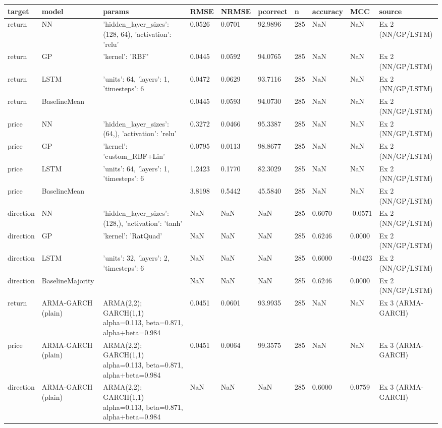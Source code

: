 \begin{table}[H]
\centering
\small
\begin{tabular}{llllllllll}
\toprule
target & model & params & RMSE & NRMSE & pcorrect & n & accuracy & MCC & source \\
\midrule
return & NN & {'hidden_layer_sizes': (128, 64), 'activation': 'relu'} & 0.0526 & 0.0701 & 92.9896 & 285 & NaN & NaN & Ex 2 (NN/GP/LSTM) \\
return & GP & {'kernel': 'RBF'} & 0.0445 & 0.0592 & 94.0765 & 285 & NaN & NaN & Ex 2 (NN/GP/LSTM) \\
return & LSTM & {'units': 64, 'layers': 1, 'timesteps': 6} & 0.0472 & 0.0629 & 93.7116 & 285 & NaN & NaN & Ex 2 (NN/GP/LSTM) \\
return & BaselineMean & {} & 0.0445 & 0.0593 & 94.0730 & 285 & NaN & NaN & Ex 2 (NN/GP/LSTM) \\
price & NN & {'hidden_layer_sizes': (64,), 'activation': 'relu'} & 0.3272 & 0.0466 & 95.3387 & 285 & NaN & NaN & Ex 2 (NN/GP/LSTM) \\
price & GP & {'kernel': 'custom_RBF+Lin'} & 0.0795 & 0.0113 & 98.8677 & 285 & NaN & NaN & Ex 2 (NN/GP/LSTM) \\
price & LSTM & {'units': 64, 'layers': 1, 'timesteps': 6} & 1.2423 & 0.1770 & 82.3029 & 285 & NaN & NaN & Ex 2 (NN/GP/LSTM) \\
price & BaselineMean & {} & 3.8198 & 0.5442 & 45.5840 & 285 & NaN & NaN & Ex 2 (NN/GP/LSTM) \\
direction & NN & {'hidden_layer_sizes': (128,), 'activation': 'tanh'} & NaN & NaN & NaN & 285 & 0.6070 & -0.0571 & Ex 2 (NN/GP/LSTM) \\
direction & GP & {'kernel': 'RatQuad'} & NaN & NaN & NaN & 285 & 0.6246 & 0.0000 & Ex 2 (NN/GP/LSTM) \\
direction & LSTM & {'units': 32, 'layers': 2, 'timesteps': 6} & NaN & NaN & NaN & 285 & 0.6000 & -0.0423 & Ex 2 (NN/GP/LSTM) \\
direction & BaselineMajority & {} & NaN & NaN & NaN & 285 & 0.6246 & 0.0000 & Ex 2 (NN/GP/LSTM) \\
return & ARMA-GARCH (plain) & ARMA(2,2); GARCH(1,1) alpha=0.113, beta=0.871, alpha+beta=0.984 & 0.0451 & 0.0601 & 93.9935 & 285 & NaN & NaN & Ex 3 (ARMA-GARCH) \\
price & ARMA-GARCH (plain) & ARMA(2,2); GARCH(1,1) alpha=0.113, beta=0.871, alpha+beta=0.984 & 0.0451 & 0.0064 & 99.3575 & 285 & NaN & NaN & Ex 3 (ARMA-GARCH) \\
direction & ARMA-GARCH (plain) & ARMA(2,2); GARCH(1,1) alpha=0.113, beta=0.871, alpha+beta=0.984 & NaN & NaN & NaN & 285 & 0.6000 & 0.0759 & Ex 3 (ARMA-GARCH) \\

\end{tabular}
\end{table}
